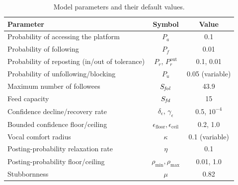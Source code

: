 \documentclass{svproc}
\def\post{\rho}                 %
\def\BoundedConfidence{\epsilon} %
\def\Stubbornness{\mu}           %
\def\maxfollower{S_{\it fol}}    %
\def\maxfeed{S_{\it fd}}         %
\def\VCR{\kappa}                 %
\begin{document}
\begin{table}[t]
\centering
\caption{Model parameters and their default values.}\label{tab:param}
\small
\begin{tabular}{lcc}
\toprule
Parameter & Symbol & Value \\
\midrule
Probability of accessing the platform & $P_a$ & 0.1 \\
Probability of following & $P_f$ & 0.01 \\
Probability of reposting (in/out of tolerance) & $P_r$, $P_r^{\mathrm{out}}$ & 0.1, 0.01 \\
Probability of unfollowing/blocking & $P_u$ & 0.05 (variable) \\
Maximum number of followees & $\maxfollower$ & 43.9 \\
Feed capacity & $\maxfeed$ & 15 \\
Confidence decline/recovery rate & $\delta_{\BoundedConfidence}$, $\gamma_{\BoundedConfidence}$ & 0.5, $10^{-4}$ \\
Bounded confidence floor/ceiling & $\BoundedConfidence_{\mathrm{floor}},\BoundedConfidence_{\mathrm{ceil}}$ & 0.2, 1.0 \\
Vocal comfort radius & $\VCR$ & 0.1 (variable) \\
Posting-probability relaxation rate & $\eta$ & 0.1 \\
Posting-probability floor/ceiling & $\post_{\min},\post_{\max}$ & 0.01, 1.0 \\
Stubbornness & $\Stubbornness$ & 0.82 \\
\bottomrule
\end{tabular}
\end{table}
\end{document}
